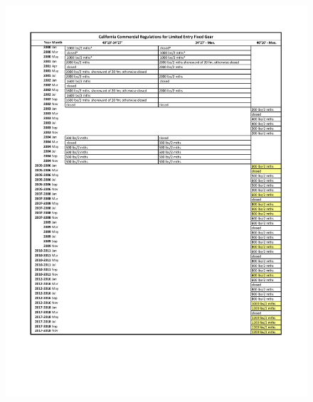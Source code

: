 \documentclass[12pt,]{article}
\begin{document}
\FloatBarrier

\begin{figure}
\centering
\includegraphics{Figures/Comm_regs2.pdf}
\caption{\label{fig:Comm_regs2}}
\end{figure}

\FloatBarrier
\end{document}
